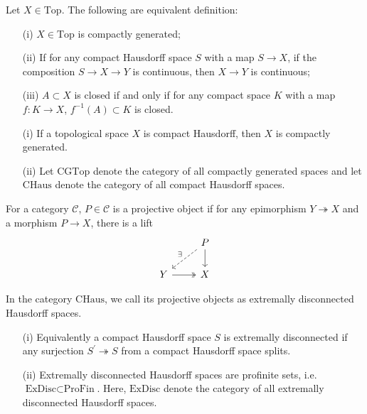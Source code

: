 \documentclass[UTF8,12,a4paper]{ctexart}
\theoremstyle{definition}
\begin{document}
\dfn Let $X\in \text{Top}.$ The following are equivalent definition:
\begin{itemize}
	\item [(i)]$X\in \text{Top}$ is compactly generated;
	\item [(ii)]If for any compact Hausdorff space $S$ with a map $S\to X$, if the composition $S\to X\to Y$ is continuous, then $X\to Y$ is continuous;
	\item [(iii)] $A\subset X$ is closed if and only if for any compact space $K$ with a map $f:K\to X$, $f^{-1}(A)\subset K$ is closed.
\end{itemize}


\rem
\begin{itemize}
	\item [(i)]If a topological space $X$ is compact Hausdorff, then $X$ is compactly generated.
	\item [(ii)] Let $\text{CGTop}$ denote the category of all compactly generated spaces and let $\text{CHaus}$ denote the category of all compact Hausdorff spaces. 
\end{itemize}

\dfn 
For a category $\mathcal{C}$, $P\in \mathcal{C}$ is a projective object if for any epimorphism $Y\twoheadrightarrow X$ and a morphism $P\to X$, there is a lift
\begin{equation*}
\begin{tikzcd}
& P \arrow[d] \arrow[ld, "\exists"', dashed] \\
Y \arrow[r, two heads] & X                                         
\end{tikzcd}
\end{equation*}

\dfn 
In the category $\text{CHaus}$, we call its projective objects as extremally disconnected Hausdorff spaces.

\rem 
\begin{itemize}
	\item [(i)] Equivalently a compact Hausdorff space $S$ is extremally disconnected if any surjection $S^\prime\twoheadrightarrow S$ from a compact Hausdorff space splits.
	\item [(ii)] Extremally disconnected Hausdorff spaces are profinite sets, i.e. $\text{ExDisc}\subset \text{ProFin}$. Here, $\text{ExDisc}$ denote the category of all extremally disconnected Hausdorff spaces.
\end{itemize}
\end{document}
